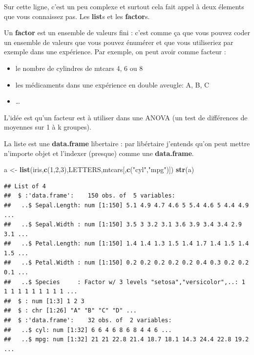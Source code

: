 \documentclass[
]{book}
\newenvironment{Shaded}{\begin{snugshade}}{\end{snugshade}}
\newcommand{\DecValTok}[1]{\textcolor[rgb]{0.00,0.00,0.81}{#1}}
\newcommand{\FunctionTok}[1]{\textcolor[rgb]{0.13,0.29,0.53}{\textbf{#1}}}
\newcommand{\NormalTok}[1]{#1}
\newcommand{\OtherTok}[1]{\textcolor[rgb]{0.56,0.35,0.01}{#1}}
\newcommand{\StringTok}[1]{\textcolor[rgb]{0.31,0.60,0.02}{#1}}
\providecommand{\tightlist}{%
  \setlength{\itemsep}{0pt}\setlength{\parskip}{0pt}}
\begin{document}
Sur cette ligne, c'est un peu complexe et surtout cela fait appel à deux élements
que vous connaissez pas. Les \textbf{list}s et les \textbf{factor}s.

Un \textbf{factor} est un ensemble de valeurs fini : c'est comme ça que vous pouvez
coder un ensemble de valeurs que vous pouvez énumérer et que vous utiliseriez
par exemple dans une expérience. Par exemple, on peut avoir comme facteur :

\begin{itemize}
\tightlist
\item
  le nombre de cylindres de mtcars 4, 6 ou 8
\item
  les médicaments dans une expérience en double aveugle: A, B, C
\item
  \ldots{}
\end{itemize}

L'idée est qu'un facteur est à utiliser dans une ANOVA (un test de différences de
moyennes sur 1 à k groupes).

La liste est une \textbf{data.frame} libertaire : par libértaire j'entends qu'on peut
mettre n'importe objet et l'indexer (presque) comme une \textbf{data.frame}.

\begin{Shaded}
\begin{Highlighting}[]
\NormalTok{a }\OtherTok{\textless{}{-}} \FunctionTok{list}\NormalTok{(iris,}\FunctionTok{c}\NormalTok{(}\DecValTok{1}\NormalTok{,}\DecValTok{2}\NormalTok{,}\DecValTok{3}\NormalTok{),LETTERS,mtcars[,}\FunctionTok{c}\NormalTok{(}\StringTok{"cyl"}\NormalTok{,}\StringTok{"mpg"}\NormalTok{)])}
\FunctionTok{str}\NormalTok{(a)}
\end{Highlighting}
\end{Shaded}

\begin{verbatim}
## List of 4
##  $ :'data.frame':    150 obs. of  5 variables:
##   ..$ Sepal.Length: num [1:150] 5.1 4.9 4.7 4.6 5 5.4 4.6 5 4.4 4.9 ...
##   ..$ Sepal.Width : num [1:150] 3.5 3 3.2 3.1 3.6 3.9 3.4 3.4 2.9 3.1 ...
##   ..$ Petal.Length: num [1:150] 1.4 1.4 1.3 1.5 1.4 1.7 1.4 1.5 1.4 1.5 ...
##   ..$ Petal.Width : num [1:150] 0.2 0.2 0.2 0.2 0.2 0.4 0.3 0.2 0.2 0.1 ...
##   ..$ Species     : Factor w/ 3 levels "setosa","versicolor",..: 1 1 1 1 1 1 1 1 1 1 ...
##  $ : num [1:3] 1 2 3
##  $ : chr [1:26] "A" "B" "C" "D" ...
##  $ :'data.frame':    32 obs. of  2 variables:
##   ..$ cyl: num [1:32] 6 6 4 6 8 6 8 4 4 6 ...
##   ..$ mpg: num [1:32] 21 21 22.8 21.4 18.7 18.1 14.3 24.4 22.8 19.2 ...
\end{verbatim}
\end{document}
